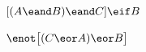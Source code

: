 \begin{earg}
\item $[(A \eand B) \eand C] \eif B$\vspace{.5ex}							
%
%
%

\item $\enot\bigl[(C\eor A) \eor B\bigr]$\vspace{.5ex} 						
%
%
%


\end{earg}
